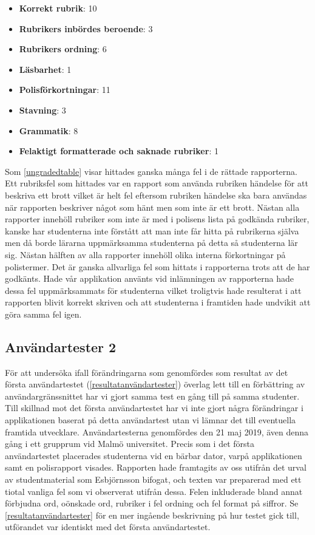 \documentclass[swedish]{maucsthesis}
\begin{document}
\begin{itemize}
\item \textbf{Korrekt rubrik}:  10
\item \textbf{Rubrikers inbördes beroende}: 3
\item \textbf{Rubrikers ordning}: 6
\item \textbf{Läsbarhet}: 1
\item \textbf{Polisförkortningar}: 11
\item \textbf{Stavning}: 3
\item \textbf{Grammatik}: 8
\item \textbf{Felaktigt formatterade och saknade rubriker}: 1
\end{itemize}

Som \cref{ungradedtable} visar hittades ganska många fel i de rättade rapporterna. 
Ett rubriksfel som hittades var en rapport som använda rubriken händelse för att beskriva ett brott vilket
är helt fel eftersom rubriken händelse ska bara användas när rapporten beskriver något som hänt men som inte är ett brott.
Nästan alla rapporter innehöll rubriker som inte är med i polisens lista på godkända rubriker, kanske har studenterna
inte förstått att man inte får hitta på rubrikerna själva men då borde lärarna uppmärksamma studenterna på detta så
studenterna lär sig. Nästan hälften av alla rapporter innehöll olika interna förkortningar på polistermer.
Det är ganska allvarliga fel som hittats i rapporterna trots att de har godkänts. Hade vår applikation använts
vid inlämningen av rapporterna hade dessa fel uppmärksammats för studenterna vilket troligtvis hade resulterat
i att rapporten blivit korrekt skriven och att studenterna i framtiden hade undvikit att göra samma fel igen.

\subsection{Användartester 2}\label{anvandartester2}

För att undersöka ifall förändringarna som genomfördes som resultat av det
första användartestet (\cref{resultatanvändartester}) överlag lett till en
förbättring av användargränssnittet har vi gjort samma test en gång till på
samma studenter. Till skillnad mot det första användartestet har vi inte gjort
några förändringar i applikationen baserat på detta användartest utan vi lämnar
det till eventuella framtida utvecklare. Användartesterna genomfördes den 21 maj
2019, även denna gång i ett grupprum vid Malmö universitet. Precis som i det
första användartestet placerades studenterna vid en bärbar dator, varpå
applikationen samt en polisrapport visades. Rapporten hade framtagits av oss
utifrån det urval av studentmaterial som Esbjörnsson bifogat, och texten var
preparerad med ett tiotal vanliga fel som vi observerat utifrån dessa. Felen
inkluderade bland annat förbjudna ord, oönskade ord, rubriker i fel ordning och
fel format på siffror. Se \cref{resultatanvändartester} för en mer ingående
beskrivning på hur testet gick till, utförandet var identiskt med det första
användartestet.
\end{document}
